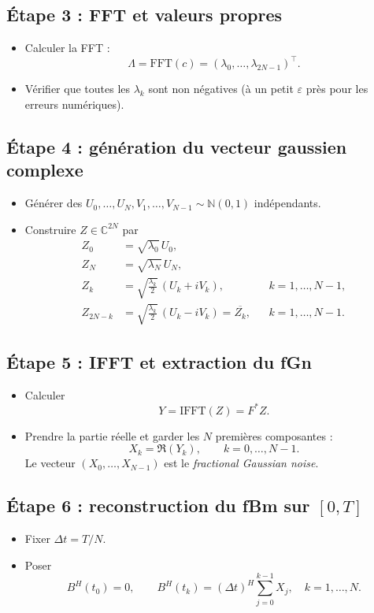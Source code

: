 \documentclass[11pt,a4paper]{article}
\newcommand{\C}{\mathbb{C}}
\newcommand{\N}{\mathbb{N}}
\newcommand{\1}{\mathbf{1}}
\newcommand{\bH}{B^{H}}
\begin{document}
\subsection*{Étape 3 : FFT et valeurs propres}
\begin{itemize}
  \item Calculer la FFT :
    \[
      \Lambda = \mathrm{FFT}(c)
              = (\lambda_0,\dots,\lambda_{2N-1})^\top.
    \]
  \item Vérifier que toutes les $\lambda_k$ sont non négatives
        (à un petit $\varepsilon$ près pour les erreurs numériques).
\end{itemize}

\subsection*{Étape 4 : génération du vecteur gaussien complexe}
\begin{itemize}
  \item Générer des $U_0,\dots,U_N,V_1,\dots,V_{N-1}\sim\N(0,1)$ indépendants.
  \item Construire $Z\in\C^{2N}$ par
    \begin{align*}
      Z_0   &= \sqrt{\lambda_0}\,U_0,\\
      Z_N   &= \sqrt{\lambda_N}\,U_N,\\
      Z_k   &= \sqrt{\frac{\lambda_k}{2}}\,(U_k + iV_k),
              &&k=1,\dots,N-1,\\
      Z_{2N-k} &= \sqrt{\frac{\lambda_k}{2}}\,(U_k - iV_k)
              = \overline{Z_k},
              &&k=1,\dots,N-1.
    \end{align*}
\end{itemize}

\subsection*{Étape 5 : IFFT et extraction du fGn}
\begin{itemize}
  \item Calculer
    \[
      Y = \mathrm{IFFT}(Z) = F^\ast Z.
    \]
  \item Prendre la partie réelle et garder les $N$ premières composantes :
    \[
      X_k = \Re(Y_k),\qquad k=0,\dots,N-1.
    \]
    Le vecteur $(X_0,\dots,X_{N-1})$ est le \emph{fractional Gaussian noise}.
\end{itemize}

\subsection*{Étape 6 : reconstruction du fBm sur $[0,T]$}
\begin{itemize}
  \item Fixer $\Delta t = T/N$.
  \item Poser
    \[
      \bH(t_0)=0,\qquad
      \bH(t_k) = (\Delta t)^H \sum_{j=0}^{k-1} X_j,\quad k=1,\dots,N.
    \]
\end{itemize}
\end{document}
